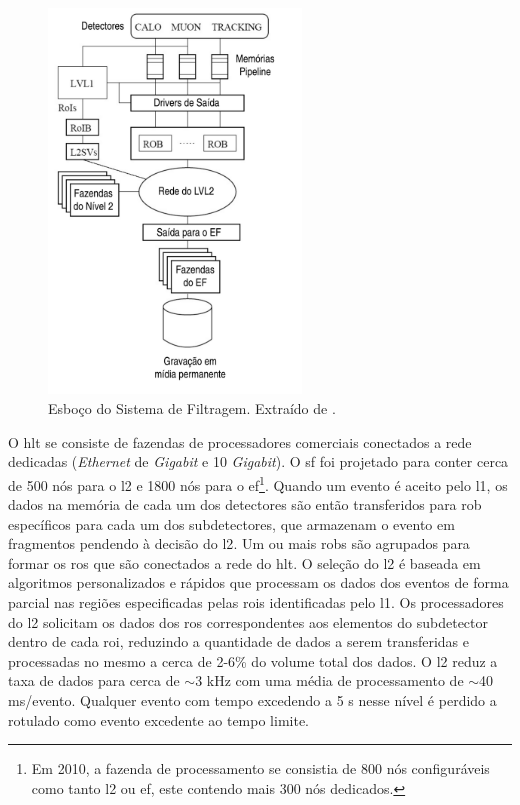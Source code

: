 \begin{figure}[ht!]
\label{fig:sf_esboco}
\centering
\includegraphics[width=0.6\textwidth]{imagens/sf_resumo.pdf}
\caption[Esboço do Sistema de Filtragem.]{Esboço do Sistema de Filtragem. Extraído de \cite{tese_eduardo}.}
\end{figure}

O \gls{hlt} se consiste de fazendas de
processadores comerciais conectados a rede dedicadas (\emph{Ethernet} de \emph{Gigabit} 
e 10 \emph{Gigabit}).  O \gls{sf} foi projetado para conter cerca de 500 nós para o
\acrshort{l2} e 1800 nós para o \acrshort{ef}\footnote{Em 2010, a fazenda de processamento 
se consistia de 800 nós configuráveis como tanto \acrshort{l2} ou \acrshort{ef}, este 
contendo mais 300 nós dedicados.}. Quando um evento é aceito pelo
\gls{l1}, os dados na memória de cada um dos detectores são então transferidos
para \gls{rob} específicos para cada um dos subdetectores, que armazenam o
evento em fragmentos pendendo à decisão do \gls{l2}. Um ou mais \glspl{rob} são
agrupados para formar os \gls{ros} que são conectados a rede do \gls{hlt}. O
seleção do \gls{l2} é baseada em algoritmos personalizados e rápidos que
processam os dados dos eventos de forma parcial nas regiões especificadas pelas
\glspl{roi} identificadas pelo \gls{l1}. Os processadores do \gls{l2} solicitam os
dados dos \gls{ros} correspondentes aos elementos do subdetector dentro de cada
\gls{roi}, reduzindo a quantidade de dados a serem transferidas e processadas no
mesmo a cerca de 2-6\% do volume total dos dados. O \gls{l2} reduz a taxa de
dados para cerca de $\sim$3 kHz com uma média de processamento de $\sim$40
ms/evento. Qualquer evento com tempo excedendo a 5 s nesse nível é perdido a
rotulado como evento excedente ao tempo limite.   

